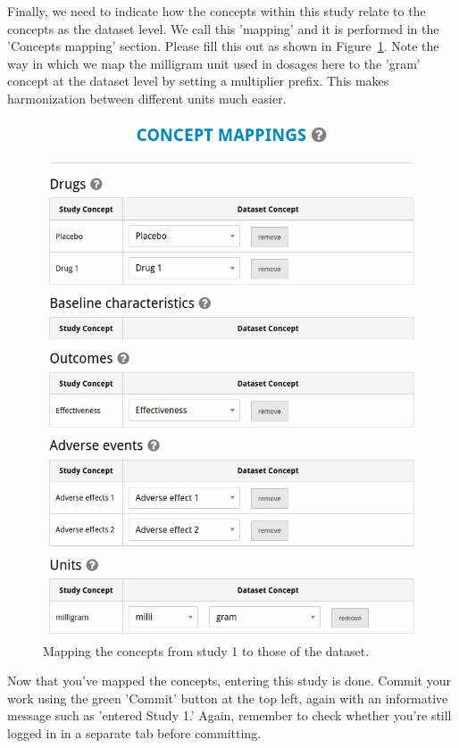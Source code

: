\documentclass[12pt]{article}
\begin{document}
Finally, we need to indicate how the concepts within this study relate to the concepts as the dataset level. We call this 'mapping' and it is performed in the 'Concepts mapping' section. Please fill this out as shown in Figure~\ref{fig:conceptMappings}. Note the way in which we map the milligram unit used in dosages here to the 'gram' concept at the dataset level by setting a multiplier prefix. This makes harmonization between different units much easier.

\begin{figure}[!htbp]
  \centering
  \includegraphics[width=\textwidth]{img/conceptMappings.png}
  \caption{Mapping the concepts from study 1 to those of the dataset.}
\label{fig:conceptMappings}
\end{figure}

Now that you've mapped the concepts, entering this study is done. Commit your work using the green 'Commit' button at the top left, again with an informative message such as 'entered Study 1.' Again, remember to check whether you're still logged in in a separate tab before committing.
\end{document}
